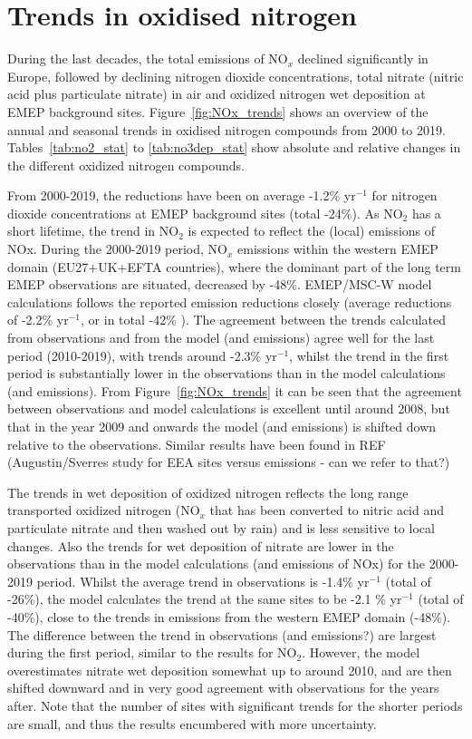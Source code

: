 \section{\label{sec:Trends_oxidised_nitrogen }Trends in oxidised nitrogen}

During the last decades, the total emissions of NO$_x$ declined significantly in Europe, followed by declining nitrogen dioxide concentrations, total nitrate (nitric acid plus particulate nitrate) in air and oxidized nitrogen wet deposition at EMEP background sites. 
Figure~\ref{fig:NOx_trends} shows an overview of the annual and seasonal trends in oxidised nitrogen compounds from 2000 to 2019. Tables~\ref{tab:no2_stat} to \ref{tab:no3dep_stat} show absolute and relative changes in the different oxidized nitrogen compounds.

From 2000-2019, the reductions have been on average -1.2\% yr$^{-1}$ for nitrogen dioxide concentrations at EMEP background sites (total -24\%). As NO$_2$ has a short lifetime, the trend in NO$_2$ is expected to reflect the (local) emissions of NOx. During the 2000-2019 period, NO$_x$ emissions within the western EMEP domain (EU27+UK+EFTA countries), where the dominant part of the long term EMEP observations are situated, decreased by -48\%. EMEP/MSC-W model calculations follows the reported emission reductions closely (average reductions of -2.2\% yr$^{-1}$, or in total -42\% ). 
The agreement between the trends calculated from observations and from the model (and emissions) agree well for the last period (2010-2019), with trends around -2.3\% yr$^{-1}$, whilst the trend in the first period is substantially lower in the observations than in the model calculations (and emissions). From Figure~\ref{fig:NOx_trends} it can be seen that the agreement between observations and model calculations is excellent until around 2008, but that in the year 2009 and onwards the model (and emissions) is shifted down relative to the observations. Similar results have been found in REF (Augustin/Sverres study for EEA sites versus emissions - can we refer to that?)


The trends in wet deposition of oxidized nitrogen reflects the long range transported oxidized nitrogen (NO$_x$ that has been converted to nitric acid and particulate nitrate and then washed out by rain) and is less sensitive to local changes. Also the trends for wet deposition of nitrate are lower in the observations than in the model calculations (and emissions of NOx) for the 2000-2019 period. Whilst the average trend in observations is -1.4\% yr$^{-1}$ (total of -26\%), the model calculates the trend at the same sites to be -2.1 \% yr$^{-1}$ (total of -40\%), close to the trends in emissions from the western EMEP domain (-48\%). The difference between the trend in observations (and emissions?) are largest during the first period, similar to the results for NO$_2$. However, the model overestimates nitrate wet deposition somewhat up to around 2010, and are then shifted downward and in very good agreement with observations for the years after. Note that the number of sites with significant trends for the shorter periods are small, and thus the results encumbered with more uncertainty.

